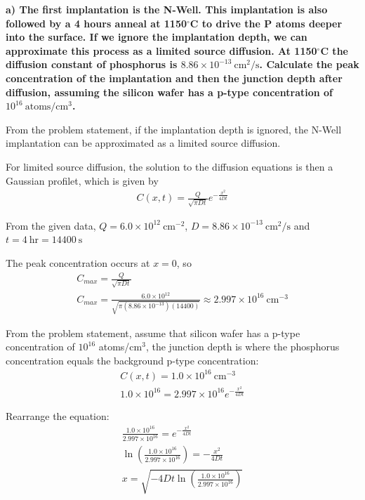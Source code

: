 \vspace{0.5em}
\noindent \textbf{a) The first implantation is the N-Well. This implantation is also followed by a 4 hours anneal at 1150$^{\circ}$C to drive the P atoms deeper into the surface. If we ignore the implantation depth, we can approximate this process as a limited source diffusion. At 1150$^{\circ}$C the diffusion constant of phosphorus is $8.86 \times 10^{-13} \ \mathrm{cm^2/s}$. Calculate the peak concentration of the implantation and then the junction depth after diffusion, assuming the silicon wafer has a p-type concentration of $10^{16} \ \mathrm{atoms/cm^3}$.}

From the problem statement, if the implantation depth is ignored, the N-Well implantation can be approximated as a limited source diffusion.

For limited source diffusion, the solution to the diffusion equations is then a Gaussian profilet, which is given by
\begin{gather*}
    C(x,t)=\frac{Q}{\sqrt{\pi Dt}}e^{-\frac{x^2}{4Dt}}
\end{gather*}

From the given data, $Q = 6.0 \times 10^{12} \ \mathrm{cm^{-2}}$, $D = 8.86 \times 10^{-13} \ \mathrm{cm^2/s}$ and $t = 4 \ \mathrm{hr} = 14400 \ \mathrm{s}$

The peak concentration occurs at $x=0$, so
\begin{gather*}
    C_{max}=\frac{Q}{\sqrt{\pi Dt}} \\
    C_{max}=\frac{6.0 \times 10^{12}}{\sqrt{\pi(8.86 \times 10^{-13})(14400)}} \approx 2.997 \times 10^{16} \ \mathrm{cm^{-3}}
\end{gather*}

From the problem statement, assume that silicon wafer has a p-type concentration
of $10^{16}$ atoms/cm$^3$, the junction depth is where the phosphorus concentration equals the background p-type concentration:
\begin{gather*}
    C(x,t)=1.0 \times 10^{16} \ \mathrm{cm^{-3}} \\
    1.0 \times 10^{16} = 2.997 \times 10^{16}e^{-\frac{x^2}{4Dt}}
\end{gather*}

Rearrange the equation:
\begin{gather*}
    \frac{1.0 \times 10^{16}}{2.997 \times 10^{16}} = e^{-\frac{x^2}{4Dt}} \\
    \ln \left(\frac{1.0 \times 10^{16}}{2.997 \times 10^{16}}\right) = -\frac{x^2}{4Dt} \\
    x = \sqrt{-4Dt \ln \left(\frac{1.0 \times 10^{16}}{2.997 \times 10^{16}}\right)}
\end{gather*}

